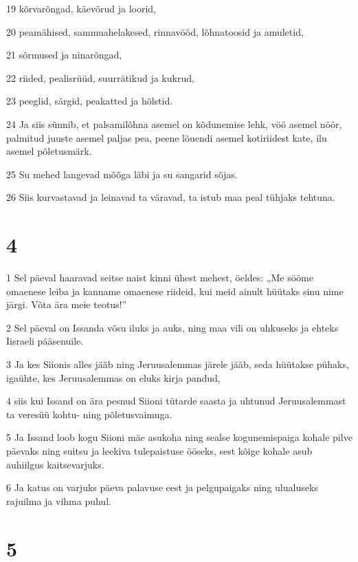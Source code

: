 \par 19 kõrvarõngad, käevõrud ja loorid,
\par 20 peamähised, sammuahelakesed, rinnavööd, lõhnatoosid ja amuletid,
\par 21 sõrmused ja ninarõngad,
\par 22 riided, pealisrüüd, suurrätikud ja kukrud,
\par 23 peeglid, särgid, peakatted ja hõlstid.
\par 24 Ja siis sünnib, et palsamilõhna asemel on kõdunemise lehk, vöö asemel nöör, palmitud juuste asemel paljas pea, peene lõuendi asemel kotiriidest kate, ilu asemel põletusmärk.
\par 25 Su mehed langevad mõõga läbi ja su sangarid sõjas.
\par 26 Siis kurvastavad ja leinavad ta väravad, ta istub maa peal tühjaks tehtuna.

\chapter{4}

\par 1 Sel päeval haaravad seitse naist kinni ühest mehest, öeldes: „Me sööme omaenese leiba ja kanname omaenese riideid, kui meid ainult hüütaks sinu nime järgi. Võta ära meie teotus!”
\par 2 Sel päeval on Issanda võsu iluks ja auks, ning maa vili on uhkuseks ja ehteks Iisraeli pääsenuile.
\par 3 Ja kes Siionis alles jääb ning Jeruusalemmas järele jääb, seda hüütakse pühaks, igaühte, kes Jeruusalemmas on eluks kirja pandud,
\par 4 siis kui Issand on ära pesnud Siioni tütarde saasta ja uhtunud Jeruusalemmast ta veresüü kohtu- ning põletusvaimuga.
\par 5 Ja Issand loob kogu Siioni mäe asukoha ning sealse kogunemispaiga kohale pilve päevaks ning suitsu ja leekiva tulepaistuse ööseks, sest kõige kohale asub auhiilgus kaitsevarjuks.
\par 6 Ja katus on varjuks päeva palavuse eest ja pelgupaigaks ning ulualuseks rajuilma ja vihma puhul.

\chapter{5}

